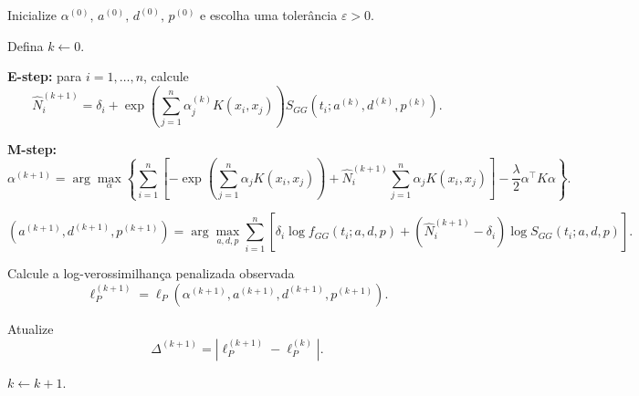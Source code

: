 
\begin{algorithm}[H]
\caption{Algoritmo EM penalizado para estimar o modelo GG-KM - $N_i \sim \mathrm{Poisson}\!\bigl(\theta(\mathbf{x}_i)\bigr).$}
\begin{algorithmic}[1]

\State Inicialize
$
\alpha^{(0)},\,
a^{(0)},\,
d^{(0)},\,
p^{(0)}
$
e escolha uma tolerância $\varepsilon>0$.

\State Defina $k \gets 0$.

\Repeat

\State \textbf{E-step:} para $i=1,\ldots,n$, calcule
\[
\widehat N_i^{(k+1)}
=
\delta_i
+
\exp\!\left(
\sum_{j=1}^{n}
\alpha_j^{(k)}
K(x_i,x_j)
\right)
S_{GG}
\!\left(
t_i;
a^{(k)},
d^{(k)},
p^{(k)}
\right).
\]

\State \textbf{M-step:}
\[
\alpha^{(k+1)}
=
\arg\max_{\alpha}
\left\{
\sum_{i=1}^{n}
\left[
-
\exp\!\left(
\sum_{j=1}^{n}
\alpha_j
K(x_i,x_j)
\right)
+
\widehat N_i^{(k+1)}
\sum_{j=1}^{n}
\alpha_j
K(x_i,x_j)
\right]
-
\frac{\lambda}{2}
\alpha^\top K\alpha
\right\}.
\]

\[
(a^{(k+1)},d^{(k+1)},p^{(k+1)})
=
\arg\max_{a,d,p}
\sum_{i=1}^{n}
\left[
\delta_i
\log f_{GG}(t_i;a,d,p)
+
(\widehat N_i^{(k+1)}-\delta_i)
\log S_{GG}(t_i;a,d,p)
\right].
\]

\State Calcule a log-verossimilhança penalizada observada
\[
\ell_P^{(k+1)}
=
\ell_P
\!\left(
\alpha^{(k+1)},
a^{(k+1)},
d^{(k+1)},
p^{(k+1)}
\right).
\]

\State Atualize
\[
\Delta^{(k+1)}
=
\left|
\ell_P^{(k+1)}
-
\ell_P^{(k)}
\right|.
\]

\State $k \gets k+1$.


\end{algorithmic}
\end{algorithm}

